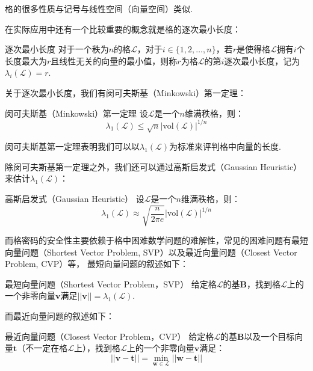 \documentclass{book}
\numberwithin{equation}{subsubsection}
\begin{document}
格的很多性质与记号与线性空间（向量空间）类似.\par
在实际应用中还有一个比较重要的概念就是格的逐次最小长度：

\begin{concept}{逐次最小长度}
    对于一个秩为$n$的格$\mathcal{L}$，对于$i\in\{1,2,\ldots,n\}$，若$r$是使得格$\mathcal{L}$拥有$i$个长度最大为$r$且线性无关的向量的最小值，则称$r$为格$\mathcal{L}$的第$i$逐次最小长度，记为$\lambda_i(\mathcal{L})=r$.
\end{concept}

关于逐次最小长度，我们有闵可夫斯基（Minkowski）第一定理：

\begin{concept}{闵可夫斯基（Minkowski）第一定理}
    设$\mathcal{L}$是一个$n$维满秩格，则：
    \begin{equation}
        \lambda_1(\mathcal{L})\le\sqrt{n}|\text{vol}(\mathcal{L})|^{1/n}
        \nonumber
    \end{equation}
\end{concept}

闵可夫斯基第一定理表明我们可以以$\lambda_1(\mathcal{L})$为标准来评判格中向量的长度.\par
除闵可夫斯基第一定理之外，我们还可以通过高斯启发式（Gaussian Heuristic）来估计$\lambda_1(\mathcal{L})$：

\begin{concept}{高斯启发式（Gaussian Heuristic）}
    设$\mathcal{L}$是一个$n$维满秩格，则：
    \begin{equation}
        \lambda_1(\mathcal{L})\approx\sqrt{\frac{n}{2\pi e}}|\text{vol}(\mathcal{L})|^{1/n}
        \nonumber
    \end{equation}
\end{concept}

而格密码的安全性主要依赖于格中困难数学问题的难解性，常见的困难问题有最短向量问题（Shortest Vector Problem, SVP）以及最近向量问题（Closest Vector Problem, CVP）等，
最短向量问题的叙述如下：

\begin{concept}{最短向量问题（Shortest Vector Problem，$\text{SVP}$）}
    给定格$\mathcal{L}$的基$\pmb{B}$，找到格$\mathcal{L}$上的一个非零向量$\pmb{v}$满足$||\pmb{v}||=\lambda_1(\mathcal{L})$.
\end{concept}

而最近向量问题的叙述如下：

\begin{concept}{最近向量问题（Closest Vector Problem，$\text{CVP}$）}
    给定格$\mathcal{L}$的基$\pmb{B}$以及一个目标向量$\pmb{t}$（不一定在格$\mathcal{L}$上），找到格$\mathcal{L}$上的一个非零向量$\pmb{v}$满足：
    \begin{equation}
        ||\pmb{v}-\pmb{t}||=\min_{\pmb{w}\in\mathcal{L}}||\pmb{w}-\pmb{t}||
        \nonumber
    \end{equation}
\end{concept}
\end{document}
